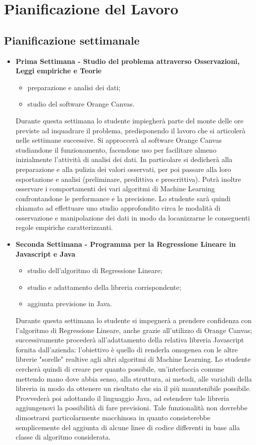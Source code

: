 \section{Pianificazione del Lavoro}
\subsection{Pianificazione settimanale}
\begin{itemize}
\item \textbf{Prima Settimana - Studio del problema attraverso Osservazioni, Leggi empiriche e Teorie}
	\begin{itemize}
	\item preparazione e analisi dei dati;
	\item studio del software Orange Canvas.
	\end{itemize}
	Durante questa settimana lo studente impiegherà parte del monte delle ore previste ad inquadrare il problema, predisponendo il lavoro che si articolerà  nelle settimane successive. Si approccerà al software Orange Canvas studiandone il funzionamento, facendone uso per facilitare almeno inizialmente l'attività di analisi dei dati. In particolare si dedicherà alla  preparazione e alla pulizia dei valori osservati, per poi passare alla loro esportazione e analisi (preliminare, predittiva e prescrittiva). Potrà inoltre osservare i comportamenti dei vari algoritmi di Machine Learning confrontandone le performance e la precisione. Lo studente sarà quindi chiamato ad effettuare uno studio approfondito circa le modalità di osservazione e manipolazione dei dati in modo da locanizzarne le conseguenti regole empiriche caratterizzanti.

\item \textbf{Seconda Settimana - Programma per la Regressione Lineare in Javascript e Java}
	\begin{itemize}
	\item studio dell'algoritmo di Regressione Lineare;
	\item studio e adattamento della libreria corrispondente;
	\item aggiunta previsione in Java.
	\end{itemize}
	Durante questa settimana lo studente si impegnerà a prendere confidenza con l'algoritmo di Regressione Lineare, anche grazie all'utilizzo di Orange Canvas; successivamente procederà all'adattamento della relativa libreria Javascript fornita dall'azienda: l'obiettivo è quello di  renderla omogenea con le altre librerie "sorelle" realtive agli altri algoritmi di Machine Learning. Lo studente cercherà quindi di creare per quanto possibile, un'interfaccia comune mettendo mano dove abbia senso, alla struttura, ai metodi, alle variabili della libreria in modo da ottenere un risultato che sia il più manutenibile possibile. Provvederà poi adottando il linguaggio Java, ad estendere tale libreria aggiungenovi la possibilità di fare previsioni. Tale funzionalità non dovrebbe dimostrarsi particolarmente macchinosa in quanto consisterebbe semplicemente del aggiunta di alcune linee di codice differenti in base alla classe di algoritmo considerata.



\end{itemize}
